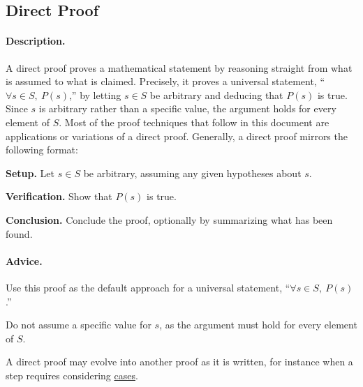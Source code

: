 \subsection{Direct Proof}
\label{subsections:techniques:universal:direct}



\paragraph{Description.}
A direct proof proves a mathematical statement by reasoning straight from %
what is assumed to what is claimed. %
Precisely, it proves a universal statement, %
``$\forall s \in S,\ P(s)$,'' %
by letting $s \in S$ be arbitrary and deducing that $P(s)$ is true. %
Since $s$ is arbitrary rather than a specific value, %
the argument holds for every element of $S$. %
Most of the proof techniques that follow in this document are %
applications or variations of a direct proof. %
Generally, a direct proof mirrors the following format:
\begin{enumerate}{
    \item \textbf{Setup.} %
        Let $s \in S$ be arbitrary, assuming any given hypotheses about $s$.
    \item \textbf{Verification.} %
        Show that $P(s)$ is true.
    \item \textbf{Conclusion.} %
        Conclude the proof, optionally by summarizing what has been found.
}
\end{enumerate}



\paragraph{Advice.}
\begin{itemize}{
    \item Use this proof as the default approach for a universal statement, %
        ``$\forall s \in S,\ P(s)$.''
    \item Do not assume a specific value for $s$, %
        as the argument must hold for every element of $S$.
    \item A direct proof may evolve into another proof as it is written, %
        for instance when a step requires considering %
        \hyperref[subsections:techniques:universal:cases]{cases}.
}
\end{itemize}



